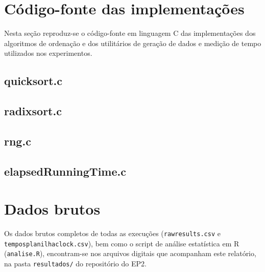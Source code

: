 \documentclass[
	12pt,
	oneside,
	a4paper,
	chapter=TITLE,
	section=TITLE,
	subsection=TITLE,
	subsubsection=TITLE,
	english,
	brazil
]{abntex2}
\theoremstyle{plain}
\theoremstyle{remark}
\renewcommand{\_}{\underscoreoriginal\allowbreak}
\begin{document}
\begin{apendicesenv}

\partapendices

\chapter{Código-fonte das implementações}
\label{ape:codigo}

Nesta seção reproduz-se o código-fonte em linguagem C das implementações dos algoritmos de ordenação e dos utilitários de geração de dados e medição de tempo utilizados nos experimentos.

\section{quicksort.c}


\section{radixsort.c}


\section{rng.c}


\section{elapsedRunningTime.c}


\chapter{Dados brutos}
\label{ape:dados}

Os dados brutos completos de todas as execuções (\texttt{raw\_results.csv} e \texttt{tempos\_planilha\_clock.csv}), bem como o script de análise estatística em R (\texttt{analise.R}), encontram-se nos arquivos digitais que acompanham este relatório, na pasta \texttt{resultados/} do repositório do EP2.

\end{apendicesenv}
\end{document}
